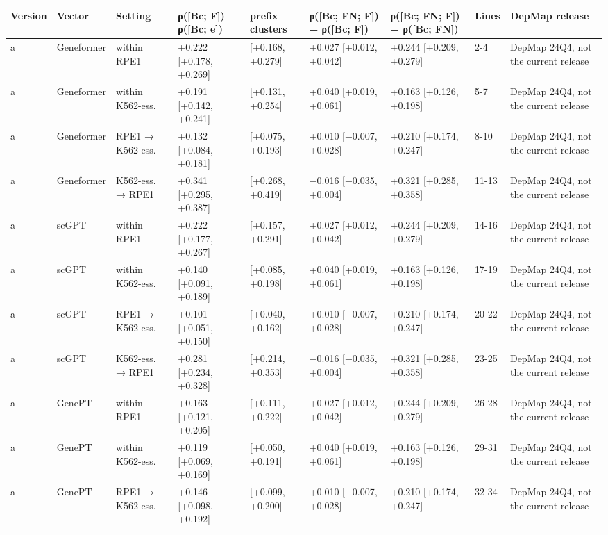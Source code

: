 \begin{tabular}{lllllllll}
\toprule
Version & Vector & Setting & ρ([Bc; F]) − ρ([Bc; e]) & prefix clusters & ρ([Bc; FN; F]) − ρ([Bc; F]) & ρ([Bc; FN; F]) − ρ([Bc; FN]) & Lines & DepMap release \\
\midrule
a & Geneformer & within RPE1 & +0.222 [+0.178, +0.269] & [+0.168, +0.279] & +0.027 [+0.012, +0.042] & +0.244 [+0.209, +0.279] & 2-4 & DepMap 24Q4, not the current release \\
a & Geneformer & within K562-ess. & +0.191 [+0.142, +0.241] & [+0.131, +0.254] & +0.040 [+0.019, +0.061] & +0.163 [+0.126, +0.198] & 5-7 & DepMap 24Q4, not the current release \\
a & Geneformer & RPE1 → K562-ess. & +0.132 [+0.084, +0.181] & [+0.075, +0.193] & +0.010 [−0.007, +0.028] & +0.210 [+0.174, +0.247] & 8-10 & DepMap 24Q4, not the current release \\
a & Geneformer & K562-ess. → RPE1 & +0.341 [+0.295, +0.387] & [+0.268, +0.419] & −0.016 [−0.035, +0.004] & +0.321 [+0.285, +0.358] & 11-13 & DepMap 24Q4, not the current release \\
a & scGPT & within RPE1 & +0.222 [+0.177, +0.267] & [+0.157, +0.291] & +0.027 [+0.012, +0.042] & +0.244 [+0.209, +0.279] & 14-16 & DepMap 24Q4, not the current release \\
a & scGPT & within K562-ess. & +0.140 [+0.091, +0.189] & [+0.085, +0.198] & +0.040 [+0.019, +0.061] & +0.163 [+0.126, +0.198] & 17-19 & DepMap 24Q4, not the current release \\
a & scGPT & RPE1 → K562-ess. & +0.101 [+0.051, +0.150] & [+0.040, +0.162] & +0.010 [−0.007, +0.028] & +0.210 [+0.174, +0.247] & 20-22 & DepMap 24Q4, not the current release \\
a & scGPT & K562-ess. → RPE1 & +0.281 [+0.234, +0.328] & [+0.214, +0.353] & −0.016 [−0.035, +0.004] & +0.321 [+0.285, +0.358] & 23-25 & DepMap 24Q4, not the current release \\
a & GenePT & within RPE1 & +0.163 [+0.121, +0.205] & [+0.111, +0.222] & +0.027 [+0.012, +0.042] & +0.244 [+0.209, +0.279] & 26-28 & DepMap 24Q4, not the current release \\
a & GenePT & within K562-ess. & +0.119 [+0.069, +0.169] & [+0.050, +0.191] & +0.040 [+0.019, +0.061] & +0.163 [+0.126, +0.198] & 29-31 & DepMap 24Q4, not the current release \\
a & GenePT & RPE1 → K562-ess. & +0.146 [+0.098, +0.192] & [+0.099, +0.200] & +0.010 [−0.007, +0.028] & +0.210 [+0.174, +0.247] & 32-34 & DepMap 24Q4, not the current release \\

\end{tabular}
